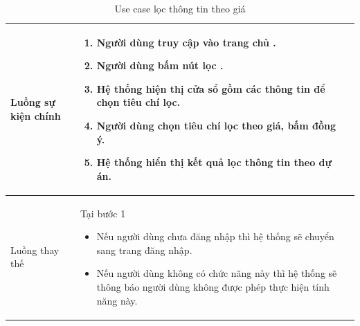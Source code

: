 \documentclass[12pt,a4paper]{article}
\begin{document}
\begin{table}[H]
\begin{tabular}{|p{3.5cm}|p{11.5cm}|c|}
            Luồng sự kiện chính & \vspace{-.8cm}\begin{enumerate}
                                                    \item Người dùng truy cập vào trang chủ .
                                                    \item Người dùng bấm nút lọc .
                                                    \item Hệ thống hiện thị cửa sổ gồm các thông tin để chọn tiêu chí lọc.
                                                    \item Người dùng chọn tiêu chí lọc theo giá, bấm đồng ý.
                                                    \item Hệ thống hiển thị kết quả lọc thông tin theo dự án.
            \end{enumerate}
            \\
            \hline
            Luồng thay thế & Tại bước 1\newline
            \vspace{-.8cm}\begin{itemize}
                              \item Nếu người dùng chưa đăng nhập thì hệ thống sẽ chuyển sang trang đăng nhập.
                              \item Nếu người dùng không có chức năng này thì hệ thống sẽ thông báo người dùng không được phép thực hiện tính năng này.
            \end{itemize}

            \\ \hline
        \end{tabular}
        \caption{Use case lọc thông tin theo giá}

    \end{table}

\end{document}
